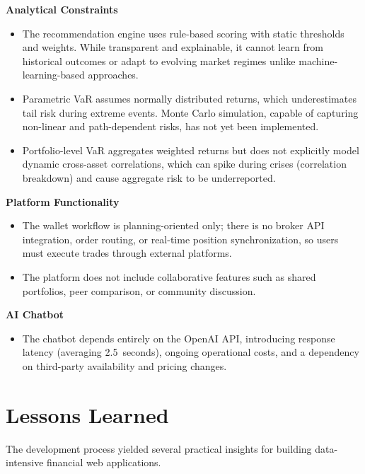 \textbf{Analytical Constraints}
\begin{itemize}
    \item The recommendation engine uses rule-based scoring with static thresholds and weights. While transparent and explainable, it cannot learn from historical outcomes or adapt to evolving market regimes unlike machine-learning-based approaches.
    \item Parametric VaR assumes normally distributed returns, which underestimates tail risk during extreme events. Monte Carlo simulation, capable of capturing non-linear and path-dependent risks, has not yet been implemented.
    \item Portfolio-level VaR aggregates weighted returns but does not explicitly model dynamic cross-asset correlations, which can spike during crises (correlation breakdown) and cause aggregate risk to be underreported.
\end{itemize}

\textbf{Platform Functionality}
\begin{itemize}
    \item The wallet workflow is planning-oriented only; there is no broker API integration, order routing, or real-time position synchronization, so users must execute trades through external platforms.
    \item The platform does not include collaborative features such as shared portfolios, peer comparison, or community discussion.
\end{itemize}

\textbf{AI Chatbot}
\begin{itemize}
    \item The chatbot depends entirely on the OpenAI API, introducing response latency (averaging 2.5~seconds), ongoing operational costs, and a dependency on third-party availability and pricing changes.
\end{itemize}

\section{Lessons Learned}

The development process yielded several practical insights for building data-intensive financial web applications.

